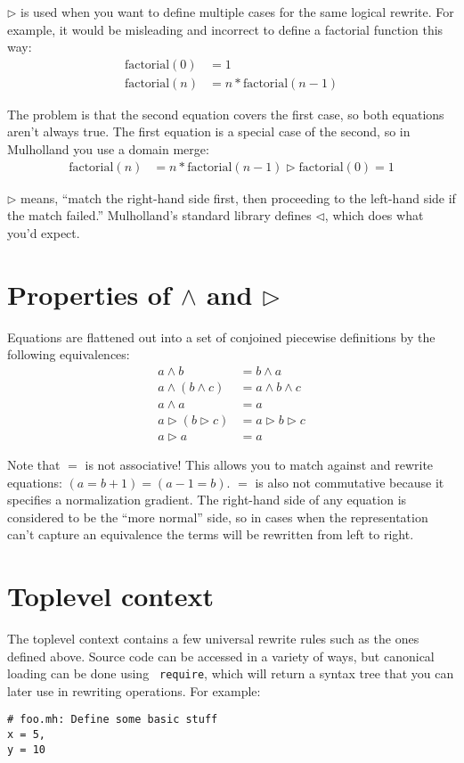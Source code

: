 \documentclass{report}
\begin{document}
    $\rhd$ is used when you want to define multiple cases for the same logical rewrite. For example, it would be misleading and incorrect to define a factorial function this way:
\begin{align*}
\textrm{factorial}(0) & = 1 \\
\textrm{factorial}(n) & = n * \textrm{factorial}(n - 1)
\end{align*}

    The problem is that the second equation covers the first case, so both equations aren't always true. The first equation is a special case of the second, so in Mulholland you use a domain
    merge:
\begin{align*}
\textrm{factorial}(n) & = n * \textrm{factorial}(n - 1) \rhd \textrm{factorial}(0) = 1
\end{align*}

    $\rhd$ means, ``match the right-hand side first, then proceeding to the left-hand side if the match failed.'' Mulholland's standard library defines $\lhd$, which does what you'd expect.

\section{Properties of $\wedge$ and $\rhd$}
    Equations are flattened out into a set of conjoined piecewise definitions by the following equivalences:
\begin{align*}
a \wedge b            & = b \wedge a \\
a \wedge (b \wedge c) & = a \wedge b \wedge c \\
a \wedge a            & = a \\
a \rhd (b \rhd c)     & = a \rhd b \rhd c \\
a \rhd a              & = a
\end{align*}

    Note that $=$ is not associative! This allows you to match against and rewrite equations: $(a = b + 1) = (a - 1 = b)$. $=$ is also not commutative because it specifies a normalization
    gradient. The right-hand side of any equation is considered to be the ``more normal'' side, so in cases when the representation can't capture an equivalence the terms will be rewritten
    from left to right.

\section{Toplevel context}
    The toplevel context contains a few universal rewrite rules such as the ones defined above. Source code can be accessed in a variety of ways, but canonical loading can be done using {\tt
    require}, which will return a syntax tree that you can later use in rewriting operations. For example:
\begin{verbatim}
# foo.mh: Define some basic stuff
x = 5,
y = 10
\end{verbatim}
\end{document}
